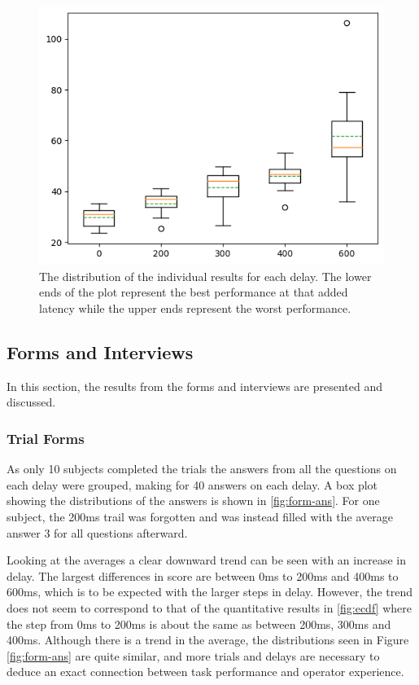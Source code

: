 \documentclass[nofilelist]{cslthse-msc}
\begin{document}
\begin{figure}[!hbt]
   \centering
   \includegraphics[scale=0.8]{images/indv-perf.png} 
   \caption{The distribution of the individual results for each delay. The lower ends of the plot represent the best performance at that added latency while the upper ends represent the worst performance.}
   \label{fig:indv-perf}
\end{figure}

\subsection{Forms and Interviews}
In this section, the results from the forms and interviews are presented and discussed.

\subsubsection{Trial Forms}
As only 10 subjects completed the trials the answers from all the questions on each delay were grouped, making for 40 answers on each delay. A box plot showing the distributions of the answers is shown in \ref{fig:form-ans}. For one subject, the 200ms trail was forgotten and was instead filled with the average answer 3 for all questions afterward.

Looking at the averages a clear downward trend can be seen with an increase in delay. The largest differences in score are between 0ms to 200ms and 400ms to 600ms, which is to be expected with the larger steps in delay. However, the trend does not seem to correspond to that of the quantitative results in \ref{fig:ecdf} where the step from 0ms to 200ms is about the same as between 200ms, 300ms and 400ms. Although there is a trend in the average, the distributions seen in Figure \ref{fig:form-ans} are quite similar, and more trials and delays are necessary to deduce an exact connection between task performance and operator experience.   
\end{document}
